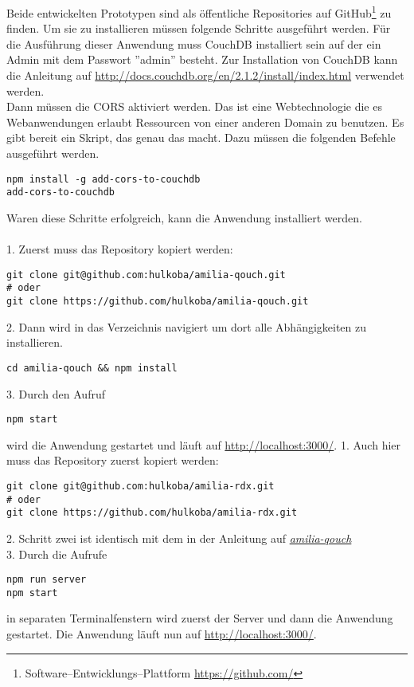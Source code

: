 Beide entwickelten Prototypen sind als öffentliche Repositories auf GitHub\footnote{Software--Entwicklungs--Plattform \url{https://github.com/}} zu finden. 
Um sie zu installieren müssen folgende Schritte ausgeführt werden.
%
%
Für die Ausführung dieser Anwendung muss CouchDB installiert sein auf der ein Admin mit dem Passwort ''admin'' besteht.
Zur Installation von CouchDB kann die Anleitung auf \url{http://docs.couchdb.org/en/2.1.2/install/index.html} verwendet werden.\\
Dann müssen die \gls{CORS} aktiviert werden. Das ist eine Webtechnologie die es Webanwendungen erlaubt Ressourcen von einer anderen Domain zu benutzen.
Es gibt bereit ein Skript, das genau das macht. Dazu müssen die folgenden Befehle ausgeführt werden.
%
\begin{lstlisting}
npm install -g add-cors-to-couchdb
add-cors-to-couchdb
\end{lstlisting}
%
Waren diese Schritte erfolgreich, kann die Anwendung installiert werden.\\\\
1. Zuerst muss das Repository kopiert werden:
\begin{lstlisting}
git clone git@github.com:hulkoba/amilia-qouch.git
# oder
git clone https://github.com/hulkoba/amilia-qouch.git
\end{lstlisting}
2. Dann wird in das Verzeichnis navigiert um dort alle Abhängigkeiten zu installieren.
\begin{lstlisting}
cd amilia-qouch && npm install
\end{lstlisting}
3. Durch den Aufruf
\begin{lstlisting}
npm start
\end{lstlisting}
wird die Anwendung gestartet und läuft auf \url{http://localhost:3000/}.
%
%
%
1. Auch hier muss das Repository zuerst kopiert werden:
\begin{lstlisting}
git clone git@github.com:hulkoba/amilia-rdx.git
# oder
git clone https://github.com/hulkoba/amilia-rdx.git
\end{lstlisting}
2. Schritt zwei ist identisch mit dem in der Anleitung auf \hyperref[chap:install:qouch]{\it{amilia-qouch}}\\
3. Durch die Aufrufe
\begin{lstlisting}
npm run server
npm start
\end{lstlisting}
in separaten Terminalfenstern wird zuerst der Server und dann die Anwendung gestartet.
Die Anwendung läuft nun auf \url{http://localhost:3000/}.
